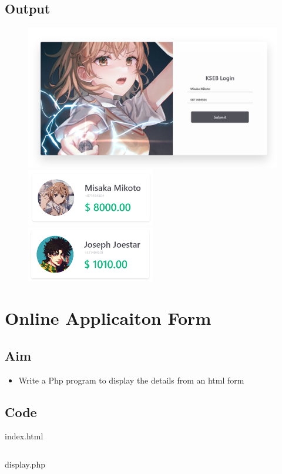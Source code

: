 \documentclass{article}
\begin{document}
\subsection{Output}
\begin{figure}[h!]
	\centering
	\includegraphics[width=1\textwidth]{./Assets/p2301.png}
	\includegraphics[width=0.5\textwidth]{./Assets/p2302.png}
	\includegraphics[width=0.5\textwidth]{./Assets/p2303.png}
\end{figure}
\newpage

\section{Online Applicaiton Form}
\subsection{Aim}
\begin{itemize}
  \item Write a Php program to display the details from an html form
\end{itemize}

\subsection{Code}
index.html
\inputminted[frame=lines, breaklines, breakanywhere, numberblanklines=false]{html}{./prog_24/index.html}
display.php
\inputminted[frame=lines, breaklines, breakanywhere, numberblanklines=false]{php}{./prog_24/display.php}
\end{document}
